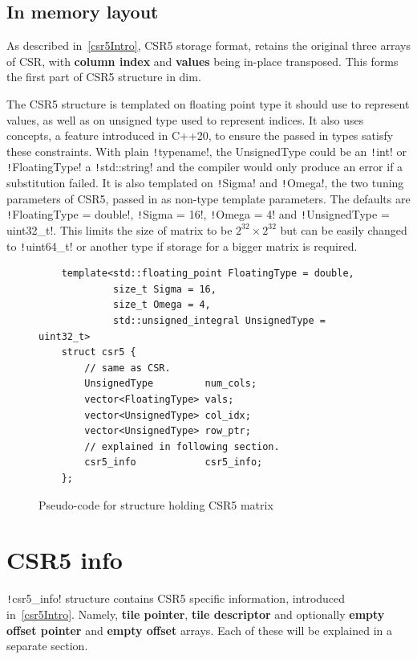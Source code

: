 \documentclass[thesis=M,english]{FITthesis}[2019/12/23]
\newcommand{\csre}[1]{\texttt!#1!}
\begin{document}
\subsection{In memory layout}

As described in~\ref{csr5Intro}, CSR5 storage format, retains the original three arrays of CSR, with
\textbf{column index} and \textbf{values} being in-place transposed. This forms the first part of
CSR5 structure in dim.

The CSR5 structure is templated on floating point type it should use to represent values,
as well as on unsigned type used to represent indices. It also uses concepts, a feature introduced in
C++20, to ensure the passed in types satisfy these constraints. With plain \csre{typename},
the UnsignedType could be an \csre{int} or \csre{FloatingType} a \csre{std::string} and the compiler
would only produce an error if a substitution failed. It is also templated on \csre{Sigma} and \csre{Omega},
the two tuning parameters of CSR5, passed in as non-type template parameters. The defaults are
\csre{FloatingType = double}, \csre{Sigma = 16}, \csre{Omega = 4} and \csre{UnsignedType = uint32_t}.
This limits the size of matrix to be \(2^{32}\times2^{32}\) but can be easily changed to \csre{uint64_t} or
another type if storage for a bigger matrix is required.

\begin{figure}[htp]
    \begin{verbatim}
    template<std::floating_point FloatingType = double,
             size_t Sigma = 16,
             size_t Omega = 4,
             std::unsigned_integral UnsignedType = uint32_t>
    struct csr5 {
        // same as CSR.
        UnsignedType         num_cols;
        vector<FloatingType> vals;
        vector<UnsignedType> col_idx;
        vector<UnsignedType> row_ptr;
        // explained in following section.
        csr5_info            csr5_info;
    };
    \end{verbatim}
    \caption{Pseudo-code for structure holding CSR5 matrix}
\end{figure}

\section{CSR5 info}

\csre{csr5_info} structure contains CSR5 specific information, introduced in~\ref{csr5Intro}.
Namely, \textbf{tile pointer}, \textbf{tile descriptor} and optionally \textbf{empty offset pointer} and
\textbf{empty offset} arrays. Each of these will be explained in a separate section.
\end{document}
